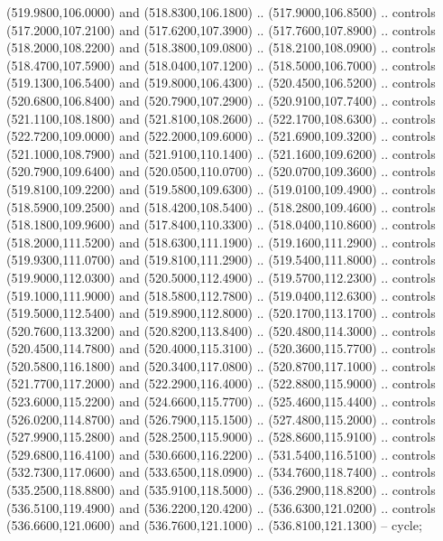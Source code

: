 {\begin{scope}[y=0.80pt, x=0.80pt, yscale=-1, xscale=1, inner sep=0pt, outer sep=0pt, #1]
      (519.9800,106.0000) and (518.8300,106.1800) .. (517.9000,106.8500) .. controls
      (517.2000,107.2100) and (517.6200,107.3900) .. (517.7600,107.8900) .. controls
      (518.2000,108.2200) and (518.3800,109.0800) .. (518.2100,108.0900) .. controls
      (518.4700,107.5900) and (518.0400,107.1200) .. (518.5000,106.7000) .. controls
      (519.1300,106.5400) and (519.8000,106.4300) .. (520.4500,106.5200) .. controls
      (520.6800,106.8400) and (520.7900,107.2900) .. (520.9100,107.7400) .. controls
      (521.1100,108.1800) and (521.8100,108.2600) .. (522.1700,108.6300) .. controls
      (522.7200,109.0000) and (522.2000,109.6000) .. (521.6900,109.3200) .. controls
      (521.1000,108.7900) and (521.9100,110.1400) .. (521.1600,109.6200) .. controls
      (520.7900,109.6400) and (520.0500,110.0700) .. (520.0700,109.3600) .. controls
      (519.8100,109.2200) and (519.5800,109.6300) .. (519.0100,109.4900) .. controls
      (518.5900,109.2500) and (518.4200,108.5400) .. (518.2800,109.4600) .. controls
      (518.1800,109.9600) and (517.8400,110.3300) .. (518.0400,110.8600) .. controls
      (518.2000,111.5200) and (518.6300,111.1900) .. (519.1600,111.2900) .. controls
      (519.9300,111.0700) and (519.8100,111.2900) .. (519.5400,111.8000) .. controls
      (519.9000,112.0300) and (520.5000,112.4900) .. (519.5700,112.2300) .. controls
      (519.1000,111.9000) and (518.5800,112.7800) .. (519.0400,112.6300) .. controls
      (519.5000,112.5400) and (519.8900,112.8000) .. (520.1700,113.1700) .. controls
      (520.7600,113.3200) and (520.8200,113.8400) .. (520.4800,114.3000) .. controls
      (520.4500,114.7800) and (520.4000,115.3100) .. (520.3600,115.7700) .. controls
      (520.5800,116.1800) and (520.3400,117.0800) .. (520.8700,117.1000) .. controls
      (521.7700,117.2000) and (522.2900,116.4000) .. (522.8800,115.9000) .. controls
      (523.6000,115.2200) and (524.6600,115.7700) .. (525.4600,115.4400) .. controls
      (526.0200,114.8700) and (526.7900,115.1500) .. (527.4800,115.2000) .. controls
      (527.9900,115.2800) and (528.2500,115.9000) .. (528.8600,115.9100) .. controls
      (529.6800,116.4100) and (530.6600,116.2200) .. (531.5400,116.5100) .. controls
      (532.7300,117.0600) and (533.6500,118.0900) .. (534.7600,118.7400) .. controls
      (535.2500,118.8800) and (535.9100,118.5000) .. (536.2900,118.8200) .. controls
      (536.5100,119.4900) and (536.2200,120.4200) .. (536.6300,121.0200) .. controls
      (536.6600,121.0600) and (536.7600,121.1000) .. (536.8100,121.1300) -- cycle;


\end{scope}}
